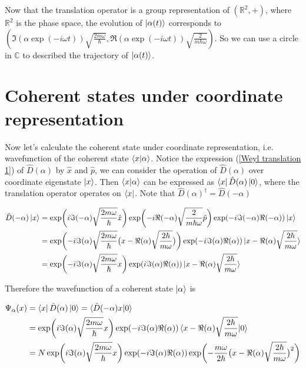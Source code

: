 \documentclass{article}
\begin{document}
        Now that the translation operator is a group representation of $(\mathbb{R}^2, +)$, where $\mathbb{R}^2$ is the phase space, the evolution of $\ket{\alpha(t)}$ corresponds to $(\Im(\alpha\exp(-i\omega t))\sqrt{\frac{2m\omega}{\hbar}}, \Re(\alpha\exp(-i\omega t))\sqrt{\frac{2}{m\hbar\omega}})$. So we can use a circle in $\mathbb{C}$ to described the trajectory of $\ket{\alpha(t)}$.

        

    \section{Coherent states under coordinate representation}
        
        Now let's calculate the coherent state under coordinate representation, i.e. wavefunction of the coherent state $\braket{x|\alpha}$. Notice the expression (\ref{Weyl translation 1}) of $\hat{D}(\alpha)$ by $\hat{x}$ and $\hat{p}$, we can consider the operation of $\hat{D}(\alpha)$ over coordinate eigenstate $\ket{x}$. Then  $\braket{x|\alpha}$ can be expressed as $\bra{x}\hat{D}(\alpha)\ket{{0}}$, where the translation operator operates on $\bra{x}$. Note that $\hat{D}(\alpha)^\dagger=\hat{D}(-\alpha)$

        \begin{equation}
            \begin{split}    
                \hat{D}(-\alpha)\ket{x} &= \exp\biggl(i\Im(-\alpha)\sqrt{\frac{2m\omega}{\hbar}}\hat{x}\biggr) \exp\biggl(-i\Re(-\alpha)\sqrt{\frac{2}{m\hbar\omega}}\hat{p}\biggr) \exp(-i \Im(-\alpha)\Re(-\alpha)) \ket{x} \\
                    &= \exp\biggl(-i\Im(\alpha)\sqrt{\frac{2m\omega}{\hbar}}\bigl(x-\Re(\alpha)\sqrt{\frac{2\hbar}{m\omega}}\bigr)\biggr) \exp(-i \Im(\alpha)\Re(\alpha)) \ket{x-\Re(\alpha)\sqrt{\frac{2\hbar}{m\omega}}}  \\
                    &= \exp\biggl(-i\Im(\alpha)\sqrt{\frac{2m\omega}{\hbar}}x\biggr) \exp(i\Im(\alpha)\Re(\alpha)) \ket{x-\Re(\alpha)\sqrt{\frac{2\hbar}{m\omega}}}
            \end{split}
        \end{equation}

        Therefore the wavefunction of a coherent state $\ket{\alpha}$ is 
        
        \begin{equation}
            \begin{split}
                \Psi_\alpha(x) &= \bra{x}\hat{D}(\alpha)\ket{0} = \braket{\hat{D}(-\alpha)x|0} \\
                    &= \exp\biggl(i\Im(\alpha)\sqrt{\frac{2m\omega}{\hbar}}x\biggr) \exp(-i\Im(\alpha)\Re(\alpha)) \braket{x-\Re(\alpha)\sqrt{\frac{2\hbar}{m\omega}} | 0} \\
                    &= N \exp\biggl(i\Im(\alpha)\sqrt{\frac{2m\omega}{\hbar}}x\biggr) \exp(-i\Im(\alpha)\Re(\alpha)) \exp\biggl(-\frac{m\omega}{2\hbar} \bigl(x-\Re(\alpha)\sqrt{\frac{2\hbar}{m\omega}}\bigr)^2 \biggr)
            \end{split}
        \end{equation}
\end{document}
